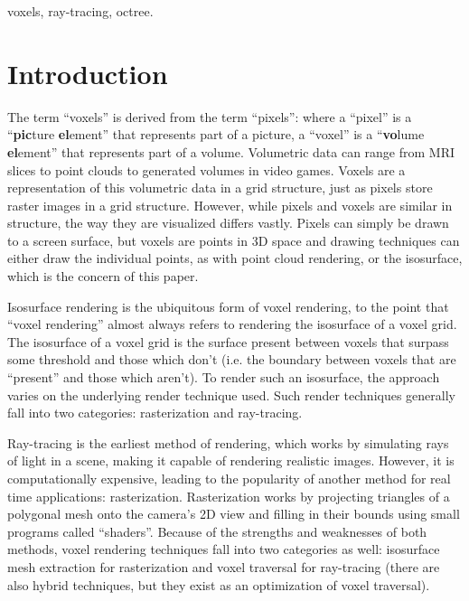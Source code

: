 \documentclass[conference]{IEEEtran}
\begin{document}
\begin{IEEEkeywords}
voxels, ray-tracing, octree.
\end{IEEEkeywords}

\section{Introduction}
The term “voxels” is derived from the term “pixels”: where a “pixel” is a “\textbf{pic}ture \textbf{el}ement” that represents part of a picture, a “voxel” is a “\textbf{vo}lume \textbf{el}ement” that represents part of a volume.
Volumetric data can range from MRI slices to point clouds to generated volumes in video games.
Voxels are a representation of this volumetric data in a grid structure, just as pixels store raster images in a grid structure.
However, while pixels and voxels are similar in structure, the way they are visualized differs vastly.
Pixels can simply be drawn to a screen surface, but voxels are points in 3D space and drawing techniques can either draw the individual points, as with point cloud rendering, or the isosurface, which is the concern of this paper.

Isosurface rendering is the ubiquitous form of voxel rendering, to the point that “voxel rendering” almost always refers to rendering the isosurface of a voxel grid.
The isosurface of a voxel grid is the surface present between voxels that surpass some threshold and those which don’t (i.e. the boundary between voxels that are “present” and those which aren’t).
To render such an isosurface, the approach varies on the underlying render technique used.
Such render techniques generally fall into two categories: rasterization and ray-tracing.

Ray-tracing is the earliest method of rendering, which works by simulating rays of light in a scene, making it capable of rendering realistic images.
However, it is computationally expensive, leading to the popularity of another method for real time applications: rasterization.
Rasterization works by projecting triangles of a polygonal mesh onto the camera’s 2D view and filling in their bounds using small programs called “shaders”.
Because of the strengths and weaknesses of both methods, voxel rendering techniques fall into two categories as well: isosurface mesh extraction for rasterization and voxel traversal for ray-tracing (there are also hybrid techniques, but they exist as an optimization of voxel traversal).
\end{document}
